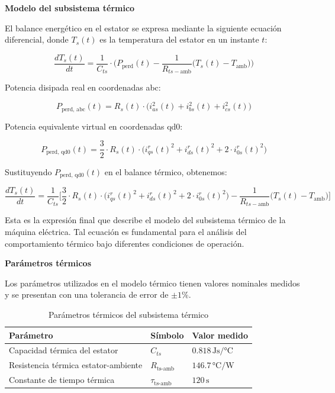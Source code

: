 \documentclass{article}
\begin{document}
\textbf{Modelo del subsistema térmico}

El balance energético en el estator se expresa mediante la siguiente ecuación diferencial, donde \( T_s(t) \) es la temperatura del estator en un instante \( t \):

\begin{equation}
\frac{dT_s(t)}{dt} = \frac{1}{C_{ts}} \cdot \Big( P_{\text{perd}}(t) - \frac{1}{R_{ts-\text{amb}}} \big( T_s(t) - T_{\text{amb}} \big) \Big)
\end{equation}


Potencia disipada real en coordenadas abc:

\begin{equation}
P_{\text{perd, abc}}(t) = R_s(t) \cdot \Big( i_{as}^2(t) + i_{bs}^2(t) + i_{cs}^2(t) \Big)
\end{equation}

Potencia equivalente virtual en coordenadas qd0:

\begin{equation}
P_{\text{perd, qd0}}(t) = \frac{3}{2} \cdot R_s(t) \cdot \Big( i_{qs}^r(t)^2 + i_{ds}^r(t)^2 + 2 \cdot i_{0s}^r(t)^2 \Big)
\end{equation}

Sustituyendo \( P_{\text{perd, qd0}}(t) \) en el balance térmico, obtenemos:

\begin{equation}
\label{eq:subsistema_termico}
\frac{dT_s(t)}{dt} = \frac{1}{C_{ts}} \Big[ \frac{3}{2} \cdot R_s(t) \cdot \Big( i_{qs}^r(t)^2 + i_{ds}^r(t)^2 + 2 \cdot i_{0s}^r(t)^2 \Big) - \frac{1}{R_{ts-\text{amb}}} \big( T_s(t) - T_{\text{amb}} \big) \Big]
\end{equation}

Esta es la expresión final que describe el modelo del subsistema térmico de la máquina eléctrica. Tal ecuación es fundamental para el análisis del comportamiento térmico bajo diferentes condiciones de operación.


\textbf{Parámetros térmicos}

Los parámetros utilizados en el modelo térmico tienen valores nominales medidos y se presentan con una tolerancia de error de \(\pm 1\%\).

\begin{table}[H]
\centering
\label{tabla_parametros_termicos}
\begin{tabular}{|l|l|l|}
\hline
\textbf{Parámetro} & \textbf{Símbolo} & \textbf{Valor medido} \\ \hline
Capacidad térmica del estator & $C_{ts}$ & $0.818 \, \text{Js/°C}$ \\ \hline
Resistencia térmica estator-ambiente & $R_{\text{ts-amb}}$ & $146.7 \, \text{°C/W}$ \\ \hline
Constante de tiempo térmica & $\tau_{\text{ts-amb}}$ & $120 \, \text{s}$ \\ \hline
\end{tabular}
\caption{Parámetros térmicos del subsistema térmico}
\end{table}
\end{document}
